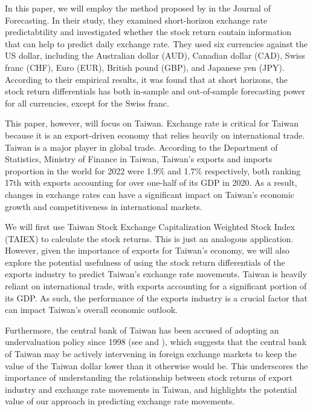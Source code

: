 \documentclass[]{AEA}
\begin{document}
\begin{spacing}{2.0}
In this paper, we will employ the method proposed by \cite{chen2019stock} in the Journal of Forecasting. In their study, they examined short-horizon exchange rate predictabtility and investigated whether the stock return contain information that can help to predict daily exchange rate. They used six currencies against the US dollar, including the Australian dollar (AUD), Canadian dollar (CAD), Swiss franc (CHF), Euro (EUR), British pound (GBP), and Japanese yen (JPY). According to their empirical results, it was found that at short horizons, the stock return differentials has both in-sample and out-of-sample forecasting power for all currencies, except for the Swiss franc.

This paper, however, will focus on Taiwan. Exchange rate is critical for Taiwan because it is an export-driven economy that relies heavily on international trade. Taiwan is a major player in global trade. According to the Department of Statistics, Ministry of Finance in Taiwan, Taiwan's exports and imports proportion in the world for 2022 were 1.9\% and 1.7\% respectively, both ranking 17th with exports accounting for over one-half of its GDP in 2020. As a result, changes in exchange rates can have a significant impact on Taiwan's economic growth and competitiveness in international markets.

We will first use Taiwan Stock Exchange Capitalization Weighted Stock Index (TAIEX) to calculate the stock returns. This is just an analogous application. However, given the importance of exports for Taiwan's economy, we will also explore the potential usefulness of using the stock return differentials of the exports industry to predict Taiwan's exchange rate movements. Taiwan is heavily reliant on international trade, with exports accounting for a significant portion of its GDP. As such, the performance of the exports industry is a crucial factor that can impact Taiwan's overall economic outlook.

Furthermore, the central bank of Taiwan has been accused of adopting an undervaluation policy since 1998 (see \cite{chen2016does} and \cite{chen2019exchange}), which suggests that the central bank of Taiwan may be actively intervening in foreign exchange markets to keep the value of the Taiwan dollar lower than it otherwise would be. This underscores the importance of understanding the relationship between stock returns of export industry and exchange rate movements in Taiwan, and highlights the potential value of our approach in predicting exchange rate movements.




\end{spacing}
\end{document}
